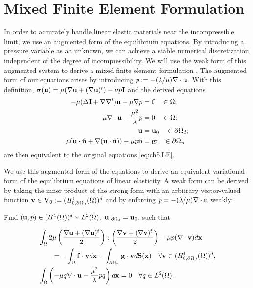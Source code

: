 \section{Mixed Finite Element Formulation} \label{sec:ch5.mixedfem}

In order to accurately handle linear elastic materials near the incompressible limit, we use an augmented form of the equilibrium equations. By introducing a pressure variable as an unknown, we can achieve a stable numerical discretization independent of the degree of incompressibility. We will use the weak form of this augmented system to derive a mixed finite element formulation \cite{Brezzi91}. The augmented form of our equations arises by introducing $p := -(\lambda/\mu) \nabla \cdot \mathbf{u}$. With this definition, $\boldsymbol{\sigma}(\mathbf{u}) = \mu (\nabla \mathbf{u} + (\nabla \mathbf{u})^t) - \mu p \mathbf{I}$ and the derived equations
\begin{subequations} \label{eq:ch5.augmented.strong}
\begin{align}
-\mu (\Delta \mathbf{I} + \nabla \nabla^t) \mathbf{u} + \mu \nabla p & = \mathbf{f} \quad \in \Omega; \label{eq:ch5.augmented.strong.PDE} \\
-\mu \nabla \cdot \mathbf{u} - \frac{\mu^2}{\lambda} p & = 0 \quad \in \Omega; \\
\mathbf{u} & = \mathbf{u}_0 \quad \in \partial\Omega_d; \\
\mu (\mathbf{u} \cdot \hat{\mathbf{n}} + \nabla (\mathbf{u} \cdot \hat{\mathbf{n}})) - \mu p \hat{\mathbf{n}} & = \mathbf{g}; \quad \in \partial\Omega_n
\end{align}
\end{subequations}
are then equivalent to the original equations \eqref{eq:ch5.LE}.

We use this augmented form of the equations to derive an equivalent variational form of the equilibrium equations of linear elasticity. A weak form can be derived by taking the inner product of the strong form with an arbitrary vector-valued function $\mathbf{v} \in \mathbf{V}_0 := (H_{0,\partial\Omega_d}^1(\Omega))^d$ and by enforcing $p = -(\lambda/\mu) \nabla \cdot \mathbf{u}$ weakly:
\begin{center}
Find $(\mathbf{u},p) \in (H^1(\Omega))^d \times L^2(\Omega)$, $\mathbf{u} \rvert_{\partial\Omega_d} = \mathbf{u}_0$, such that
\end{center}
\begin{subequations} \label{eq:ch5.augmented.weak}
\begin{align}
& \int_{\Omega} 2 \mu \left( \frac{\nabla \mathbf{u} + (\nabla \mathbf{u})^t}{2} \right) : \left( \frac{\nabla \mathbf{v} + (\nabla \mathbf{v})^t}{2} \right) - \mu p (\nabla \cdot \mathbf{v}) d\mathbf{x} \\
& \qquad = -\int_{\Omega} \mathbf{f} \cdot \mathbf{v} d\mathbf{x} + \int_{\partial\Omega_n} \mathbf{g} \cdot \mathbf{v} d\mathbf{S}(\mathbf{x}) \quad \forall \mathbf{v} \in (H^1_{0,\partial\Omega_d}(\Omega))^d, \\
& \int_{\Omega} \left( -\mu q \nabla \cdot \mathbf{u} - \frac{\mu^2}{\lambda} p q \right) d\mathbf{x} = 0 \quad \forall q \in L^2(\Omega).
\end{align}
\end{subequations}

